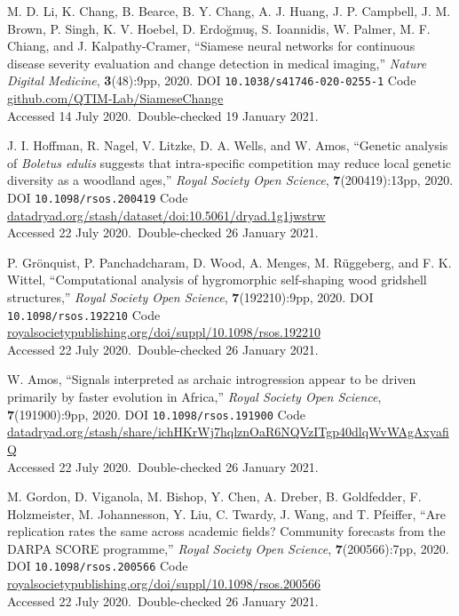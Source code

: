 \vbox{
{\sc M. D. Li, K. Chang, B. Bearce, B. Y. Chang, A. J. Huang, J. P. Campbell, J. M. Brown, P. Singh, K. V. Hoebel, D. Erdo{\u g}mu\c{s}, S. Ioannidis, W. Palmer, M. F. Chiang, and J. Kalpathy-Cramer}, ``Siamese neural networks for continuous disease severity evaluation and change detection in medical imaging,'' \emph{Nature Digital Medicine}, \textbf{3}(48):9pp, 2020. DOI \texttt{10.1038/s41746-020-0255-1} {Code \url{github.com/QTIM-Lab/SiameseChange}}\\\hfill{Accessed 14 July 2020.}\ {Double-checked 19 January 2021}.}\bibskip

\vbox{
{\sc J. I. Hoffman, R. Nagel, V. Litzke, D. A. Wells, and W. Amos}, ``Genetic analysis of \emph{Boletus edulis\/} suggests that intra-specific competition may reduce local genetic diversity as a woodland ages,'' \emph{Royal Society Open Science}, \textbf{7}(200419):13pp, 2020. DOI \texttt{10.1098/rsos.200419} {Code \url{datadryad.org/stash/dataset/doi:10.5061/dryad.1g1jwstrw}}\\\hfill{Accessed 22 July 2020.}\ {Double-checked 26 January 2021}.}\bibskip

\vbox{
{\sc P. Gr\"onquist, P. Panchadcharam, D. Wood, A. Menges, M. R\"uggeberg, and F. K. Wittel}, ``Computational analysis of hygromorphic self-shaping wood gridshell structures,'' \emph{Royal Society Open Science}, \textbf{7}(192210):9pp, 2020. DOI \texttt{10.1098/rsos.192210} {Code \url{royalsocietypublishing.org/doi/suppl/10.1098/rsos.192210}}\\\hfill{Accessed 22 July 2020.}\ {Double-checked 26 January 2021}.}\bibskip

\vbox{
{\sc W. Amos}, ``Signals interpreted as archaic introgression appear to be driven primarily by faster evolution in Africa,'' \emph{Royal Society Open Science}, \textbf{7}(191900):9pp, 2020. DOI \texttt{10.1098/rsos.191900} {Code \url{datadryad.org/stash/share/ichHKrWj7hqlznOaR6NQVzITgp40dlqWvWAgAxyafiQ}}\\\hfill{Accessed 22 July 2020.}\ {Double-checked 26 January 2021}.}\bibskip

\vbox{
{\sc M. Gordon, D. Viganola, M. Bishop, Y. Chen, A. Dreber, B. Goldfedder, F. Holzmeister, M. Johannesson, Y. Liu, C. Twardy, J. Wang, and T. Pfeiffer}, ``Are replication rates the same across academic fields? Community forecasts from the DARPA SCORE programme,'' \emph{Royal Society Open Science}, \textbf{7}(200566):7pp, 2020. DOI \texttt{10.1098/rsos.200566} {Code \url{royalsocietypublishing.org/doi/suppl/10.1098/rsos.200566}}\\\hfill{Accessed 22 July 2020.}\ {Double-checked 26 January 2021}.}\bibskip

